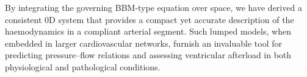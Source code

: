 \documentclass[alpha-refs, 12pt]{wiley-article}
\begin{document}
By integrating the governing BBM-type equation over space, we have derived a consistent 0D system that provides a compact yet accurate description of the haemodynamics in a compliant arterial segment. Such lumped models, when embedded in larger cardiovascular networks, furnish an invaluable tool for predicting pressure–flow relations and assessing ventricular afterload in both physiological and pathological conditions.
\end{document}
